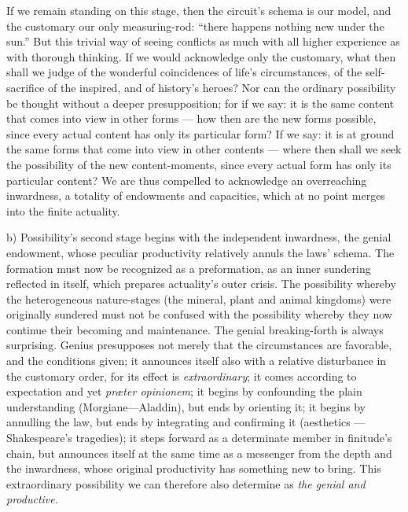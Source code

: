 \documentclass[12pt]{book}
\begin{document}
If we remain standing on this stage, then the circuit's schema is our model,
and the customary our only measuring-rod: ``there happens nothing new under
the sun.'' But this trivial way of seeing conflicts as much with all higher
experience as with thorough thinking. If we would acknowledge only the
customary, what then shall we judge of the wonderful coincidences of life's
circumstances, of the self-sacrifice of the inspired, and of history's
heroes? Nor can the ordinary possibility be thought without a deeper
presupposition; for if we say: it is the same content that comes into view
in other forms --- how then are the new forms possible, since every actual
content has only its particular form? If we say: it is at ground the same
forms that come into view in other contents --- where then shall we seek the
possibility of the new content-moments, since every actual form has only its
particular content? We are thus compelled to acknowledge an overreaching
inwardness, a totality of endowments and capacities, which at no point
merges into the finite actuality.

b) Possibility's second stage begins with the independent inwardness, the
genial endowment, whose peculiar productivity relatively annuls the laws'
schema. The formation must now be recognized as a preformation, as an inner
sundering reflected in itself, which prepares actuality's outer crisis. The
possibility whereby the heterogeneous nature-stages (the mineral, plant and
animal kingdoms) were originally sundered must not be confused with the
possibility whereby they now continue their becoming and maintenance. The
genial breaking-forth is always surprising. Genius presupposes not merely
that the circumstances are favorable, and the conditions given; it announces
itself also with a relative disturbance in the customary order, for its
effect is \emph{extraordinary}; it comes according to expectation and yet
\textit{præter opinionem}; it begins by confounding the plain understanding
(Morgiane---Aladdin), but ends by orienting it; it begins by annulling the
law, but ends by integrating and confirming it (aesthetics ---
Shakespeare's tragedies); it steps forward as a determinate member in
finitude's chain, but announces itself at the same time as a messenger from
the depth and the inwardness, whose original productivity has something new
to bring. This extraordinary possibility we can therefore also determine as
\emph{the genial and productive}.
\end{document}
